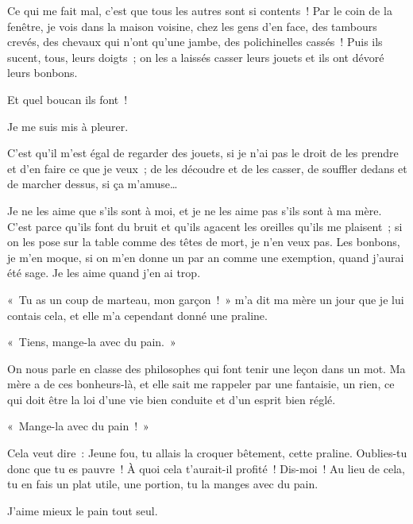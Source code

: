 \documentclass[french,twoside]{book} %
\def\mednobreak{\ifdim\lastskip<\medskipamount
  \removelastskip\nopagebreak\medskip\fi}
\newcommand{\labelblock}[1]{\medbreak{\noindent\color{rubric}\bfseries #1}\par\mednobreak}
\begin{document}
Ce qui me fait mal, c’est que tous les autres sont si contents ! Par le coin de la fenêtre, je vois dans la maison voisine, chez les gens d’en face, des tambours crevés, des chevaux qui n’ont qu’une jambe, des polichinelles cassés ! Puis ils sucent, tous, leurs doigts ; on les a laissés casser leurs jouets et ils ont dévoré leurs bonbons.\par
Et quel boucan ils font !\par
\bigbreak
\noindent Je me suis mis à pleurer.\par
C’est qu’il m’est égal de regarder des jouets, si je n’ai pas le droit de les prendre et d’en faire ce que je veux ; de les découdre et de les casser, de souffler dedans et de marcher dessus, si ça m’amuse…\par
Je ne les aime que s’ils sont à moi, et je ne les aime pas s’ils sont à ma mère. C’est parce qu’ils font du bruit et qu’ils agacent les oreilles qu’ils me plaisent ; si on les pose sur la table comme des têtes de mort, je n’en veux pas. Les bonbons, je m’en moque, si on m’en donne un par an comme une exemption, quand j’aurai été sage. Je les aime quand j’en ai trop.\par
« Tu as un coup de marteau, mon garçon ! » m’a dit ma mère un jour que je lui contais cela, et elle m’a cependant donné une praline.\par
« Tiens, mange-la avec du pain. »\par
On nous parle en classe des philosophes qui font tenir une leçon dans un mot. Ma mère a de ces bonheurs-là, et elle sait me rappeler par une fantaisie, un rien, ce qui doit être la loi d’une vie bien conduite et d’un esprit bien réglé.\par
« Mange-la avec du pain ! »\par
Cela veut dire : Jeune fou, tu allais la croquer bêtement, cette praline. Oublies-tu donc que tu es pauvre ! À quoi cela t’aurait-il profité ! Dis-moi ! Au lieu de cela, tu en fais un plat utile, une portion, tu la manges avec du pain.\par
J’aime mieux le pain tout seul.\par

\labelblock{LA SAINT-ANTOINE}
\end{document}
